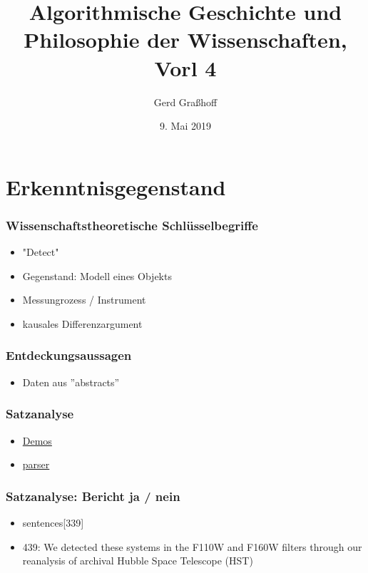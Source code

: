 \documentclass[11pt]{beamer}
\author{Gerd Graßhoff}
\title{Algorithmische Geschichte und Philosophie der Wissenschaften, Vorl 4}
\date{9. Mai 2019}
\begin{document}
	\begin{frame}[plain]
		\maketitle
	\end{frame}
	

\section{Erkenntnisgegenstand}

	\begin{frame}
	\frametitle{Wissenschaftstheoretische Schlüsselbegriffe}
	\begin{itemize}
		\item "Detect"
		\item Gegenstand: Modell eines Objekts
		\item Messungrozess / Instrument
		\item kausales Differenzargument
	\end{itemize}
\end{frame}

	\begin{frame}
	\frametitle{Entdeckungsaussagen}
	\begin{itemize}
		\item Daten aus ''abstracts''
	\end{itemize}
\end{frame}

	\begin{frame}
	\frametitle{Satzanalyse}
	\begin{itemize}
		\item \href{https://explosion.ai/demos/}{Demos}
		\item \href{https://spacy-vis.apps.allenai.org/spacy-parser}{parser}
	\end{itemize}
\end{frame}


	\begin{frame}
	\frametitle{Satzanalyse: Bericht ja / nein}
	\begin{itemize}
		\item sentences[339]
		\item 439: We detected these systems in the F110W and F160W filters through our reanalysis of archival Hubble Space Telescope (HST)
	\end{itemize}
\end{frame}
\end{document}
